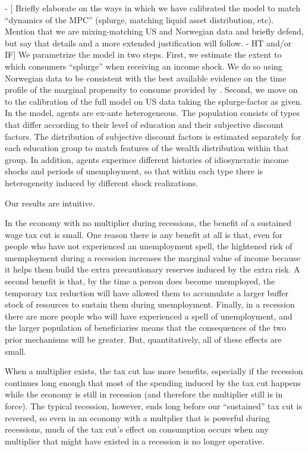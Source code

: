 \documentclass[../HAFiscal]{subfiles}
\begin{document}
- [ Briefly elaborate on the ways in which we have calibrated the model to match ``dynamics of the MPC'' (splurge, matching liquid asset distribution, etc).  Mention that we are mixing-matching US and Norwegian data and briefly defend, but say that details and a more extended justification will follow. - HT and/or IF]
We parametrize the model in two steps. First, we estimate the extent to which consumers ``splurge'' when receiving an income shock. We do so using Norwegian data to be consistent with the best available evidence on the time profile of the marginal propensity to consume provided by \citet{fagereng_mpc_2021}. Second, we move on to the calibration of the full model on US data taking the splurge-factor as given. In the model, agents are ex-ante heterogeneous. The population consists of types that differ according to their level of education and their subjective discount factors. The distribution of subjective discount factors is estimated separately for each education group to match features of the wealth distribution within that group. In addition, agents experince different histories of idiosyncratic income shocks and periods of unemployment, so that within each type there is heterogeneity induced by different shock realizations. 


Our results are intuitive.

In the economy with no multiplier during recessions, the benefit of a sustained wage tax cut is small.  One reason there is any benefit at all is that, even for people who have not experienced an unemployment spell, the hightened risk of unemployment during a recession increases the marginal value of income because it helps them build the extra precautionary reserves induced by the extra risk.  A second benefit is that, by the time a person does become unemployed, the temporary tax reduction will have allowed them to accumulate a larger buffer stock of resources to sustain them during unemployment.  Finally, in a recession there are more people who will have experienced a spell of unemployment, and the larger population of beneficiaries means that the consequences of the two prior mechanisms will be greater.  But, quantitatively, all of these effects are small.

When a multiplier exists, the tax cut has more benefits, especially if the recession continues long enough that most of the spending induced by the tax cut happens while the economy is still in recession (and therefore the multiplier still is in force).  The typical recession, however, ends long before our ``sustained'' tax cut is reversed, so even in an economy with a multplier that is powerful during recessions, much of the tax cut's effect on consumption occurs when any multiplier that might have existed in a recession is no longer operative.
\end{document}

